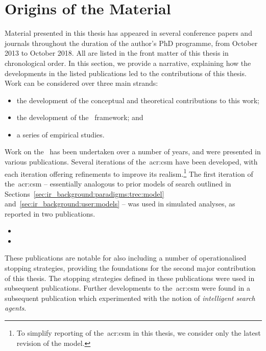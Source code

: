 \section{Origins of the Material}
Material presented in this thesis has appeared in several conference papers and journals throughout the duration of the author's PhD programme, from October 2013 to October 2018. All are listed in the front matter of this thesis in chronological order. In this section, we provide a narrative, explaining how the developments in the listed publications led to the contributions of this thesis. Work can be considered over three main strands:

\begin{itemize}
    \item{the development of the conceptual and theoretical contributions to this work;}
    \item{the development of the \simiir~framework; and}
    \item{a series of empirical studies.}
\end{itemize}

\noindent
{}
Work on the~ has been undertaken over a number of years, and were presented in various publications. Several iterations of the~\gls{acr:csm} have been developed, with each iteration offering refinements to improve its realism.\footnote{To simplify reporting of the~\gls{acr:csm} in this thesis, we consider only the latest revision of the model.} The first iteration of the~\gls{acr:csm} -- essentially analogous to prior models of search outlined in Sections~\ref{sec:ir_background:paradigms:trec:model} and~\ref{sec:ir_background:user:models} -- was used in simulated analyses, as reported in two publications.

\begin{itemize}
    \item{}
    \item{}
\end{itemize}

These publications are notable for also including a number of operationalised stopping strategies, providing the foundations for the second major contribution of this thesis. The stopping strategies defined in these publications were used in subsequent publications. Further developments to the~\gls{acr:csm} were found in a subsequent publication which experimented with the notion of \emph{intelligent search agents}.

